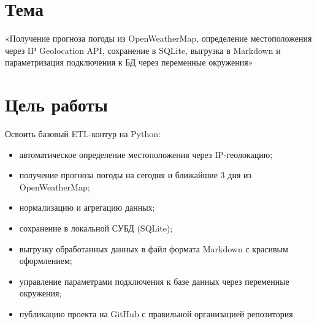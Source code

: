 \documentclass[oneside,a4paper,14pt]{extarticle}
\begin{document}
\newpage\thispagestyle{empty}
\newpage
\setcounter{page}{1}
\tableofcontents
\newpage

\section*{Тема}
«Получение прогноза погоды из OpenWeatherMap, определение местоположения через IP Geolocation API, сохранение в SQLite, выгрузка в Markdown и параметризация подключения к БД через переменные окружения»

\section*{Цель работы}
Освоить базовый ETL-контур на Python:
\begin{itemize}
	\item автоматическое определение местоположения через IP-геолокацию;
	\item получение прогноза погоды на сегодня и ближайшие 3 дня из OpenWeatherMap;
	\item нормализацию и агрегацию данных;
	\item сохранение в локальной СУБД (SQLite);
	\item выгрузку обработанных данных в файл формата Markdown с красивым оформлением;
	\item управление параметрами подключения к базе данных через переменные окружения;
	\item публикацию проекта на GitHub с правильной организацией репозитория.
\end{itemize}
\end{document}
